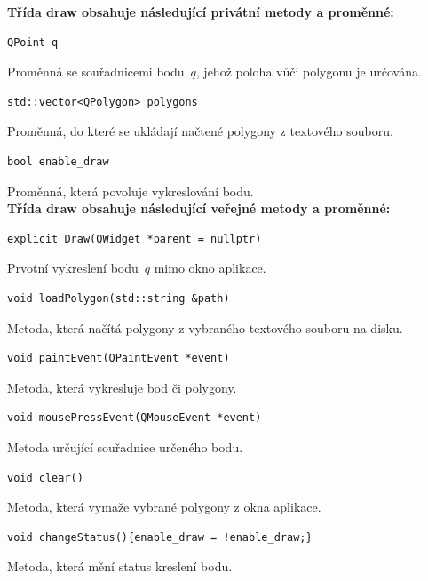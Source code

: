 \documentclass[a4paper, 12pt, oneside, titlepage]{article} %
\begin{document}
\textbf{Třída draw obsahuje následující privátní metody a proměnné:}
\begin{verbatim}
QPoint q
\end{verbatim}
Proměnná se souřadnicemi bodu~$q$, jehož poloha vůči polygonu je určována.\\

\begin{verbatim}
std::vector<QPolygon> polygons
\end{verbatim}
Proměnná, do které se ukládají načtené polygony z textového souboru.\\

\begin{verbatim}
bool enable_draw
\end{verbatim}
Proměnná, která povoluje vykreslování bodu.\\

\textbf{Třída draw obsahuje následující veřejné metody a proměnné:}
\begin{verbatim}
explicit Draw(QWidget *parent = nullptr)
\end{verbatim}
Prvotní vykreslení bodu~$q$ mimo okno aplikace.\\

\begin{verbatim}
void loadPolygon(std::string &path)
\end{verbatim}
Metoda, která načítá polygony z vybraného textového souboru na disku.\\

\begin{verbatim}
void paintEvent(QPaintEvent *event)
\end{verbatim}
Metoda, která vykresluje bod či polygony.\\

\begin{verbatim}
void mousePressEvent(QMouseEvent *event)
\end{verbatim}
Metoda určující souřadnice určeného bodu.\\

\begin{verbatim}
void clear()
\end{verbatim}
Metoda, která vymaže vybrané polygony z okna aplikace.\\

\begin{verbatim}
void changeStatus(){enable_draw = !enable_draw;}
\end{verbatim}
Metoda, která mění status kreslení bodu.\\
\end{document}
